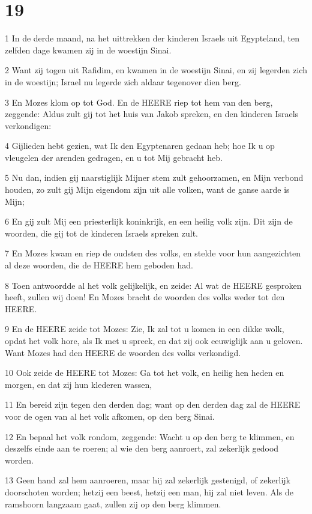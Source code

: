 \chapter{19}

\par 1 In de derde maand, na het uittrekken der kinderen Israels uit Egypteland, ten zelfden dage kwamen zij in de woestijn Sinai.
\par 2 Want zij togen uit Rafidim, en kwamen in de woestijn Sinai, en zij legerden zich in de woestijn; Israel nu legerde zich aldaar tegenover dien berg.
\par 3 En Mozes klom op tot God. En de HEERE riep tot hem van den berg, zeggende: Aldus zult gij tot het huis van Jakob spreken, en den kinderen Israels verkondigen:
\par 4 Gijlieden hebt gezien, wat Ik den Egyptenaren gedaan heb; hoe Ik u op vleugelen der arenden gedragen, en u tot Mij gebracht heb.
\par 5 Nu dan, indien gij naarstiglijk Mijner stem zult gehoorzamen, en Mijn verbond houden, zo zult gij Mijn eigendom zijn uit alle volken, want de ganse aarde is Mijn;
\par 6 En gij zult Mij een priesterlijk koninkrijk, en een heilig volk zijn. Dit zijn de woorden, die gij tot de kinderen Israels spreken zult.
\par 7 En Mozes kwam en riep de oudsten des volks, en stelde voor hun aangezichten al deze woorden, die de HEERE hem geboden had.
\par 8 Toen antwoordde al het volk gelijkelijk, en zeide: Al wat de HEERE gesproken heeft, zullen wij doen! En Mozes bracht de woorden des volks weder tot den HEERE.
\par 9 En de HEERE zeide tot Mozes: Zie, Ik zal tot u komen in een dikke wolk, opdat het volk hore, als Ik met u spreek, en dat zij ook eeuwiglijk aan u geloven. Want Mozes had den HEERE de woorden des volks verkondigd.
\par 10 Ook zeide de HEERE tot Mozes: Ga tot het volk, en heilig hen heden en morgen, en dat zij hun klederen wassen,
\par 11 En bereid zijn tegen den derden dag; want op den derden dag zal de HEERE voor de ogen van al het volk afkomen, op den berg Sinai.
\par 12 En bepaal het volk rondom, zeggende: Wacht u op den berg te klimmen, en deszelfs einde aan te roeren; al wie den berg aanroert, zal zekerlijk gedood worden.
\par 13 Geen hand zal hem aanroeren, maar hij zal zekerlijk gestenigd, of zekerlijk doorschoten worden; hetzij een beest, hetzij een man, hij zal niet leven. Als de ramshoorn langzaam gaat, zullen zij op den berg klimmen.
